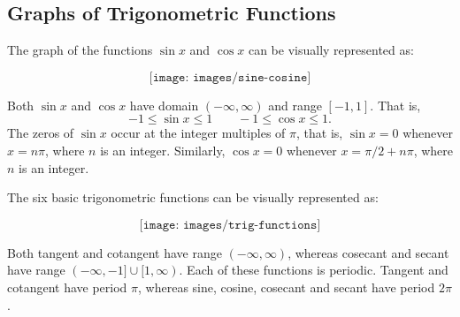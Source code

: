 \subsection{Graphs of Trigonometric Functions}
The graph of the functions $\sin x$ and $\cos x$ can be visually represented as:

$$\texttt{[image: images/sine-cosine]}$$

Both $\sin x$ and $\cos x$ have domain $(-\infty,\infty)$ and range $[-1,1]$.
That is,
$$-1\leq\sin x\leq 1\qquad -1\leq\cos x\leq 1.$$
The zeros of $\sin x$ occur at the integer multiples of $\pi$, that is, $\sin x=0$ whenever $x=n\pi$, where $n$ is an integer.
Similarly, $\cos x=0$ whenever $x=\pi/2+n\pi$, where $n$ is an integer.

The six basic trigonometric functions can be visually represented as:

$$\texttt{[image: images/trig-functions]}$$

Both tangent and cotangent have range $(-\infty,\infty)$, whereas cosecant and secant have range $(-\infty,-1]\cup[1,\infty)$.
Each of these functions is periodic. Tangent and cotangent have period $\pi$, whereas sine, cosine, cosecant and secant have period $2\pi$.